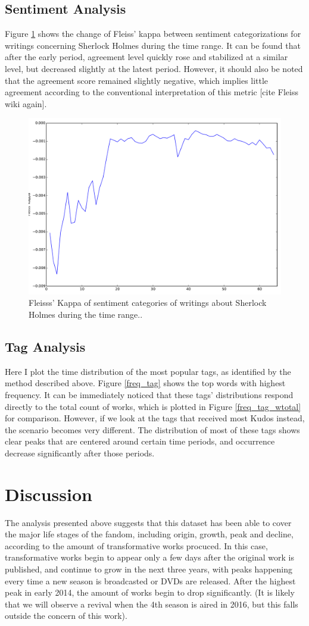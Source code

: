 \documentclass{pnastwo}
\begin{document}
\begin{article}
\subsection{Sentiment Analysis} Figure \ref{fleiss} shows the change of Fleiss' kappa between sentiment categorizations for writings concerning Sherlock Holmes during the time range. It can be found that after the early period, agreement level quickly rose and stabilized at a similar level, but decreased slightly at the latest period. However, it should also be noted that the agreement score remained slightly negative, which implies little agreement according to the conventional interpretation of this metric [cite Fleiss wiki again]. 


\begin{figure}
\centerline{\includegraphics[width=.4\textwidth]{fleiss_kappa.pdf}}
\caption{Fleisss' Kappa of sentiment categories of writings about Sherlock Holmes during the time range..}\label{fleiss}
\end{figure}


\subsection{Tag Analysis} Here I plot the time distribution of the most popular tags, as identified by the method described above.  Figure \ref{freq_tag} shows the top words with highest frequency. It can be immediately noticed that these tags' distributions respond directly to the total count of works, which is plotted in Figure \ref{freq_tag_wtotal} for comparison. 
However, if we look at the tags that received most Kudos instead, the scenario becomes very different. The distribution of most of these tags shows clear peaks that are centered around certain time periods, and occurrence decrease significantly after those periods. 



\section{Discussion}
The analysis presented above suggests that this dataset has been able to cover the major life stages of the fandom, including origin, growth, peak and decline, according to the amount of transformative works procuced. In this case, transformative works begin to appear only a few days after the original work is published, and continue to grow in the next three years, with peaks happening every time a new season is broadcasted or DVDs are released. After the highest peak in early 2014, the amount of works begin to drop significantly. (It is likely that we will observe a revival when the 4th season is aired in 2016, but this falls outside the concern of this work). 


\end{article}
\end{document}
